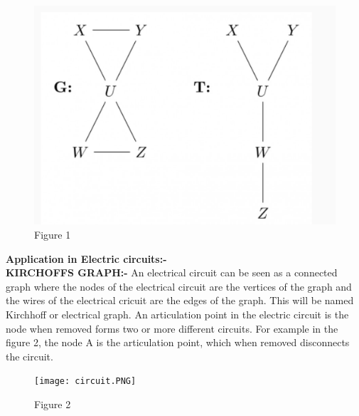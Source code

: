 \documentclass[journal,12pt,twocolumn]{IEEEtran}
\begin{document}
\begin{figure}
    \centering
    \includegraphics[scale=0.6]{assignment1.png}
    \caption{Figure 1}
    \label{fig: figure1}
\end{figure}
\textbf{Application in Electric circuits:-}\\
\textbf{KIRCHOFFS GRAPH:-}
An electrical circuit can be seen as a connected graph where the nodes of the
electrical circuit are the vertices of the graph and the wires of the electrical cricuit
are the edges of the graph. This will be named Kirchhoff or electrical graph. 
An articulation point in the electric circuit is the node when removed forms two or more different circuits. For example in the figure 2, the node A is the articulation point, which when removed disconnects the circuit.
\begin{figure}
    \centering
    \texttt{[image: circuit.PNG]}
    \caption{Figure 2}
    \label{fig:figure2}
\end{figure}
\end{document}

